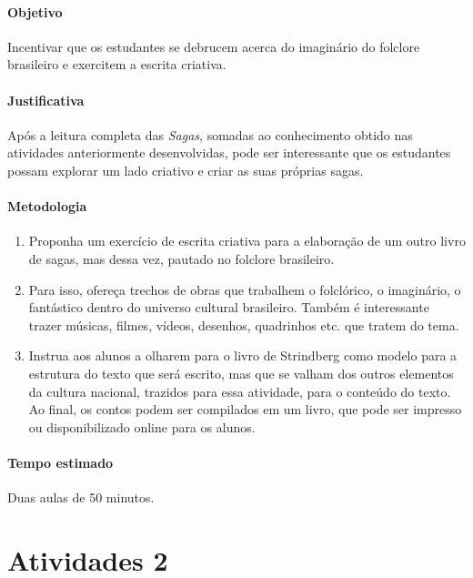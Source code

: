 \documentclass[12pt]{extarticle}
\begin{document}
\paragraph{Objetivo} Incentivar que os estudantes se debrucem acerca do imaginário
do folclore brasileiro e exercitem a escrita criativa.

\paragraph{Justificativa} Após a leitura completa das \emph{Sagas}, somadas ao
conhecimento obtido nas atividades anteriormente desenvolvidas, pode ser interessante 
que os estudantes possam explorar um lado criativo e criar as suas próprias sagas.

\paragraph{Metodologia}

\begin{enumerate}

\item Proponha
um exercício de escrita criativa para a elaboração de um outro livro de
sagas, mas dessa vez, pautado no folclore brasileiro.

\item Para isso, ofereça
trechos de obras que trabalhem o folclórico, o imaginário, o fantástico
dentro do universo cultural brasileiro. Também é interessante trazer
músicas, filmes, vídeos, desenhos, quadrinhos etc. que tratem do tema.

\item Instrua aos alunos a olharem para o livro de Strindberg como modelo para
a estrutura do texto que será escrito, mas que se valham dos outros
elementos da cultura nacional, trazidos para essa atividade, para o
conteúdo do texto. Ao final, os contos podem ser compilados em um livro,
que pode ser impresso ou disponibilizado online para os alunos.

\end{enumerate}

\paragraph{Tempo estimado} Duas aulas de 50 minutos.



\section{Atividades 2}
\end{document}
